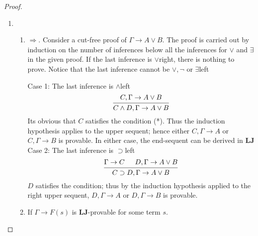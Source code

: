 \documentclass[11pt]{article}
\def \LJ {\textbf{LJ}}
\begin{document}
\begin{proof}
\begin{enumerate}
\item \begin{enumerate}
\item \(\Rightarrow\). Consider a cut-free proof of \(\Gamma\to A\vee B\). The proof is carried
out by induction on the number of inferences below all the inferences for \(\vee\)
and \(\exists\) in the given proof. If the last inference is \(\vee\)right, there is
nothing to prove. Notice that the last inference cannot be \(\vee,\neg\) or \(\exists\)left

Case 1: The last inference is \(\wedge\)left
\begin{equation*}
\begin{prooftree}%
\hypo{C,\Gamma\to A\vee B}
\infer1{C\wedge D,\Gamma\to A\vee B}
\end{prooftree}
\end{equation*}
Its obvious that \(C\) satisfies the condition (*). Thus the induction hypothesis applies
to the upper sequent; hence either \(C,\Gamma\to A\) or \(C,\Gamma\to B\) is provable. In
either case, the end-sequent can be derived in \(\LJ\)
Case 2: The last inference is \(\supset\)left
\begin{equation*}
\begin{prooftree}%
\hypo{\Gamma\to C}
\hypo{D,\Gamma\to A\vee B}
\infer2{C\supset D,\Gamma\to A\vee B}
\end{prooftree}
\end{equation*}
\(D\) satisfies the condition; thus by the induction hypothesis applied to the right upper
sequent, \(D,\Gamma\to A\) or \(D,\Gamma\to B\) is provable.
\item If \(\Gamma\to F(s)\) is \(\LJ\)-provable for some term \(s\).
\end{enumerate}
\end{enumerate}
\end{proof}
\end{document}
